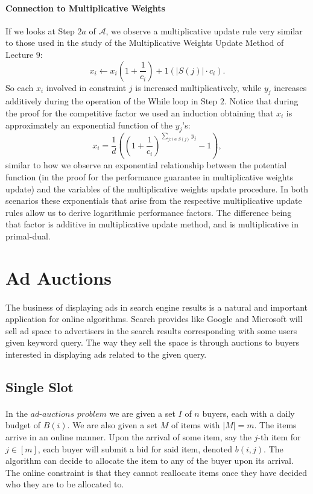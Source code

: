 \documentclass[letterpaper,12pt,oneside,onecolumn]{article}
\newcommand{\cA}{\mathcal{A}} \newcommand{\cB}{\mathcal{B}}
\begin{document}
\paragraph{Connection to Multiplicative Weights}
If we looks at Step $2a$ of $\cA$, we observe a multiplicative update rule very similar to those used in the study of the Multiplicative Weights Update Method of Lecture $9$:
$$x_i \leftarrow x_i(1+\frac{1}{c_i}) + 1(|S(j)|\cdot c_i).$$
So each $x_i$ involved in constraint $j$ is increased multiplicatively, while $y_j$ increases additively during the operation of the While loop in Step $2$. Notice that during the proof for the competitive factor we used an induction obtaining that $x_i$ is approximately an exponential function of the $y_j$'s:
$$x_i = \frac{1}{d}((1+\frac{1}{c_i})^{\sum_{j : i \in S(j)} y_j} -1),$$
similar to how we observe an exponential relationship between the potential function (in the proof for the performance guarantee in multiplicative weights update) and the variables of the multiplicative weights update procedure. In both scenarios these exponentials that arise from the respective multiplicative update rules allow us to derive logarithmic performance factors. The difference being that factor is additive in multiplicative update method, and is multiplicative in primal-dual.
\section{Ad Auctions}
\paragraph{}
The business of displaying ads in search engine results is a natural and important application for online algorithms. Search provides like Google and Microsoft will sell ad space to advertisers in the search results corresponding with some users given keyword query. The way they sell the space is through auctions to buyers interested in displaying ads related to the given query.

\subsection{Single Slot}
\paragraph{}
In the $\textit{ad-auctions problem}$ we are given a set $I$ of $n$ buyers, each with a daily budget of $B(i)$. We are also given a set $M$ of items with $|M| = m$. The items arrive in an online manner. Upon the arrival of some item, say the $j$-th item for $j \in [m]$, each buyer will submit a bid for said item, denoted $b(i,j)$. The algorithm can decide to allocate the item to any of the buyer upon its arrival. The online constraint is that they cannot reallocate items once they have decided who they are to be allocated to.
\end{document}
